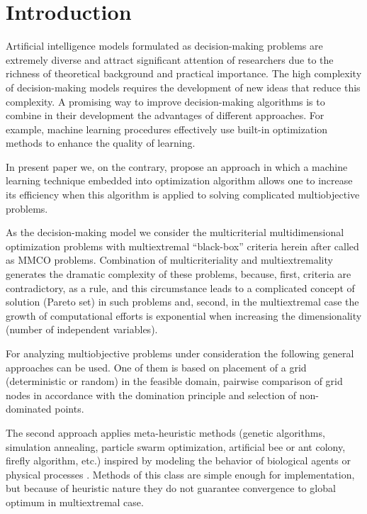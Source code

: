 \documentclass[runningheads]{llncs}
\begin{document}
\section{Introduction}
Artificial intelligence models formulated as decision-making problems are extremely diverse and attract significant attention of researchers due to the richness of theoretical background and practical importance. The high complexity of decision-making models requires the development of new ideas that reduce this complexity. A promising way to improve decision-making algorithms is to combine in their development the advantages of different approaches. For example, machine learning procedures effectively use built-in optimization methods to enhance the quality of learning. 

In present paper we, on the contrary, propose an approach in which a machine learning technique embedded into optimization algorithm allows one to increase its efficiency when this algorithm is applied to solving complicated multiobjective problems. 

As the decision-making model we consider the multicriterial multidimensional optimization problems with multiextremal ``black-box'' criteria herein after called as MMCO problems. Combination of multicriteriality and multiextremality generates the dramatic complexity of these problems, because, first, criteria are contradictory, as a rule, and this circumstance leads to a complicated concept of solution (Pareto set) in such problems and, second, in the multiextremal case the growth of computational efforts is exponential when increasing the dimensionality (number of independent variables).

For analyzing multiobjective problems under consideration the following general approaches can be used. One of them is based on placement of a grid (deterministic or random) in the feasible domain, pairwise comparison of grid nodes in accordance with the domination principle and selection of non-dominated points. 

The second approach applies meta-heuristic methods (genetic algorithms, simulation annealing, particle swarm optimization, artificial bee or ant colony, firefly algorithm, etc.) inspired by modeling the behavior of biological agents \cite{Nebro2009,RC05,Mostaghim2007,Durillo2010} or physical processes \cite{DPA02,ZLT01}. Methods of this class are simple enough for implementation, but because of heuristic nature they do not guarantee convergence to global optimum in multiextremal case. 
\end{document}
